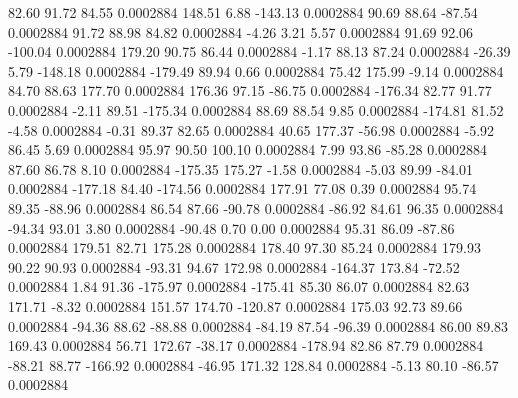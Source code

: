        82.60       91.72       84.55     0.0002884
      148.51        6.88     -143.13     0.0002884
       90.69       88.64      -87.54     0.0002884
       91.72       88.98       84.82     0.0002884
       -4.26        3.21        5.57     0.0002884
       91.69       92.06     -100.04     0.0002884
      179.20       90.75       86.44     0.0002884
       -1.17       88.13       87.24     0.0002884
      -26.39        5.79     -148.18     0.0002884
     -179.49       89.94        0.66     0.0002884
       75.42      175.99       -9.14     0.0002884
       84.70       88.63      177.70     0.0002884
      176.36       97.15      -86.75     0.0002884
     -176.34       82.77       91.77     0.0002884
       -2.11       89.51     -175.34     0.0002884
       88.69       88.54        9.85     0.0002884
     -174.81       81.52       -4.58     0.0002884
       -0.31       89.37       82.65     0.0002884
       40.65      177.37      -56.98     0.0002884
       -5.92       86.45        5.69     0.0002884
       95.97       90.50      100.10     0.0002884
        7.99       93.86      -85.28     0.0002884
       87.60       86.78        8.10     0.0002884
     -175.35      175.27       -1.58     0.0002884
       -5.03       89.99      -84.01     0.0002884
     -177.18       84.40     -174.56     0.0002884
      177.91       77.08        0.39     0.0002884
       95.74       89.35      -88.96     0.0002884
       86.54       87.66      -90.78     0.0002884
      -86.92       84.61       96.35     0.0002884
      -94.34       93.01        3.80     0.0002884
      -90.48        0.70        0.00     0.0002884
       95.31       86.09      -87.86     0.0002884
      179.51       82.71      175.28     0.0002884
      178.40       97.30       85.24     0.0002884
      179.93       90.22       90.93     0.0002884
      -93.31       94.67      172.98     0.0002884
     -164.37      173.84      -72.52     0.0002884
        1.84       91.36     -175.97     0.0002884
     -175.41       85.30       86.07     0.0002884
       82.63      171.71       -8.32     0.0002884
      151.57      174.70     -120.87     0.0002884
      175.03       92.73       89.66     0.0002884
      -94.36       88.62      -88.88     0.0002884
      -84.19       87.54      -96.39     0.0002884
       86.00       89.83      169.43     0.0002884
       56.71      172.67      -38.17     0.0002884
     -178.94       82.86       87.79     0.0002884
      -88.21       88.77     -166.92     0.0002884
      -46.95      171.32      128.84     0.0002884
       -5.13       80.10      -86.57     0.0002884
